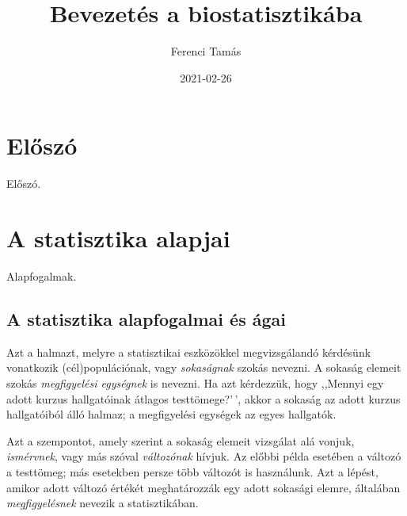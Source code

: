 \documentclass[
]{book}
\title{Bevezetés a biostatisztikába}
\author{Ferenci Tamás}
\date{2021-02-26}
\begin{document}
\maketitle

{
\setcounter{tocdepth}{1}
\tableofcontents
}
\hypertarget{elux151szuxf3}{%
\chapter{Előszó}\label{elux151szuxf3}}

Előszó.

\hypertarget{a-statisztika-alapjai}{%
\chapter{A statisztika alapjai}\label{a-statisztika-alapjai}}

Alapfogalmak.

\hypertarget{a-statisztika-alapfogalmai-uxe9s-uxe1gai}{%
\section{A statisztika alapfogalmai és ágai}\label{a-statisztika-alapfogalmai-uxe9s-uxe1gai}}

Azt a halmazt, melyre a statisztikai eszközökkel megvizsgálandó kérdésünk vonatkozik (cél)populációnak, vagy \emph{sokaságnak} szokás nevezni. A sokaság elemeit szokás \emph{megfigyelési egységnek} is nevezni. Ha azt kérdezzük, hogy ,,Mennyi egy adott kurzus hallgatóinak átlagos testtömege?'\,', akkor a sokaság az adott kurzus hallgatóiból álló halmaz; a megfigyelési egységek az egyes hallgatók.

Azt a szempontot, amely szerint a sokaság elemeit vizsgálat alá vonjuk, \emph{ismérvnek}, vagy más szóval \emph{változónak} hívjuk. Az előbbi példa esetében a változó a testtömeg; más esetekben persze több változót is használunk. Azt a lépést, amikor adott változó értékét meghatározzák egy adott sokasági elemre, általában \emph{megfigyelésnek} nevezik a statisztikában.
\end{document}
